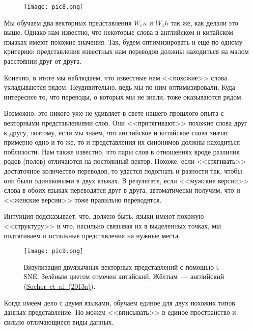 \documentclass[a4paper,12pt]{article}
\begin{document}
\begin{figure}[t]
\begin{center}
\texttt{[image: pic8.png]}
\end{center}
\end{figure}


Мы обучаем два векторных представления $W_en$ и $W_zh$ так же, как делали это выше. Однако нам известно, что некоторые слова в английском и китайском язызках имеют похожие значения. Так, будем оптимизировать и ещё по одному критерию: представления известных нам переводов должны находиться на малом расстоянии друг от друга.

Конечно, в итоге мы наблюдаем, что известные нам <<похожие>> слова укладываются рядом. Неудивительно, ведь мы по ним оптимизировали. Куда интереснее то, что переводы, о которых мы не знали, тоже оказываются рядом.

Возможно, это никого уже не удивляет в свете нашего прошлого опыта с векторными представлениями слов. Они <<притягивают>> похожие слова друг к другу, поэтому, если мы знаем, что английское и китайское слова значат примерно одно и то же, то и представления их синонимов должны находиться поблизости. Нам также известно, что пары слов в отношениях вроде различия родов (полов) отличаются на постоянный вектор.  Похоже, если <<стягивать>> достаточное количество переводов, то удастся подогнать и разности так, чтобы они были одинаковыми в двух языках. В результате, если <<мужские версии>> слова в обоих языках переводятся друг в друга, автоматически получим, что и <<женские версии>> тоже правильно переводятся.

Интуиция подсказывает, что, должно быть, языки имеют похожую <<структуру>> и что, насильно связывая их в выделенных точках, мы подтягиваем и остальные представления на нужные места.

\begin{figure}[t]
\begin{center}
\texttt{[image: pic9.png]}
\caption{Визулизация двуязычных векторных представлений с помощью t-SNE. Зелёным цветом отмечен китайский, Жёлтым~--- английский (\href{http://ai.stanford.edu/~wzou/emnlp2013_ZouSocherCerManning.pdf}{Socher~et~al. (2013a)}).}
\end{center}
\end{figure}

Когда имеем дело с двумя языками, обучаем единое для двух похожих типов данных представление. Но можем <<вписывать>> в единое пространство и сильно отличающиеся виды данных.
\end{document}
